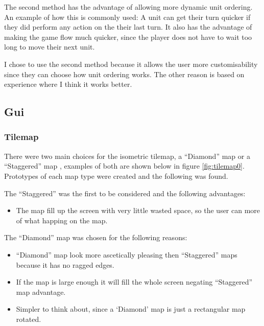 The second method has the advantage of allowing more dynamic unit ordering.  An example of how this is commonly used: A unit can get their turn quicker if they did perform any action on the their last turn. It also has the advantage of making the game flow much quicker, since the player does not have to wait too long to move their next unit. 

I chose to use the second method because it allows the user more customisability since they can choose how unit ordering works. The other reason is based on experience where I think it works better.

\subsection{Gui}

\subsubsection{Tilemap}
\label{sub:tilemap}

There were two main choices for the isometric tilemap, a ``Diamond'' map or a  ``Staggered'' map \cite{isometric_game_programming}, examples of both are shown below in figure \ref{fig:tilemap0}. Prototypes of each map type were created and the following was found.  

The ``Staggered'' was the first to be considered and the following advantages:
\begin{itemize}
	\item The map fill up the screen with very little wasted space, so the user can more of what happing on the map. 
\end{itemize}

The ``Diamond'' map was chosen for the following reasons:
\begin{itemize}
	\item ``Diamond'' map look more ascetically pleasing then ``Staggered'' maps because it has no ragged edges.
	\item  If the map is large enough it will fill the whole screen negating ``Staggered'' map advantage.
	\item  Simpler to think about, since a `Diamond' map is just a rectangular map rotated.
\end{itemize}


